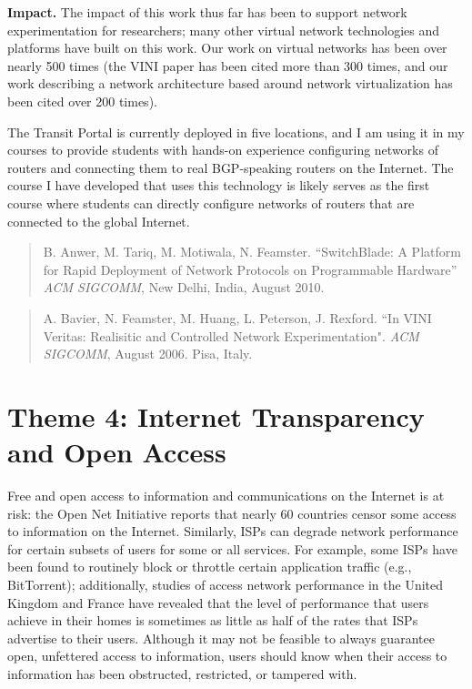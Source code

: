 {\bf Impact.}  The impact of this work thus far has been to support
network experimentation for researchers; many other virtual network
technologies and platforms have built on this work. Our work on virtual
networks has been over nearly 500 times (the VINI paper has been cited
more than 300 times, and our work describing a network architecture
based around network virtualization has been cited over 200 times).

The Transit Portal is currently deployed in five locations, and I am
using it in my courses to provide students with hands-on experience
configuring networks of routers and connecting them to real BGP-speaking
routers on the Internet.  The course I have developed that uses this
technology is likely serves as the first course where students can
directly configure networks of routers that are connected to the global
Internet.

\begin{quote}
B. Anwer, M. Tariq, M. Motiwala, N. Feamster. ``SwitchBlade: A Platform
for Rapid Deployment of Network Protocols on Programmable Hardware''
{\em ACM SIGCOMM}, New Delhi, India, August 2010.
\end{quote}

\begin{quote}
A. Bavier, N. Feamster, M. Huang, L. Peterson, J. Rexford. ``In VINI
Veritas: Realisitic and Controlled Network Experimentation". {\em ACM
SIGCOMM}, August 2006. Pisa, Italy.
\end{quote}





\section*{Theme 4: Internet Transparency and Open Access}

Free and open access to information and communications on the Internet
is at risk: the Open Net Initiative reports that nearly 60 countries
censor some access to information on the Internet.  Similarly, ISPs can
degrade network performance for certain subsets of users for some or all
services.  For example, some ISPs have been found to routinely block or
throttle certain application traffic (e.g., BitTorrent); additionally,
studies of access network performance in the United Kingdom and France
have revealed that the level of performance that users achieve in their
homes is sometimes as little as half of the rates that ISPs advertise to
their users.  Although it may not be feasible to always guarantee open,
unfettered access to information, users should know when their access to
information has been obstructed, restricted, or tampered with.

